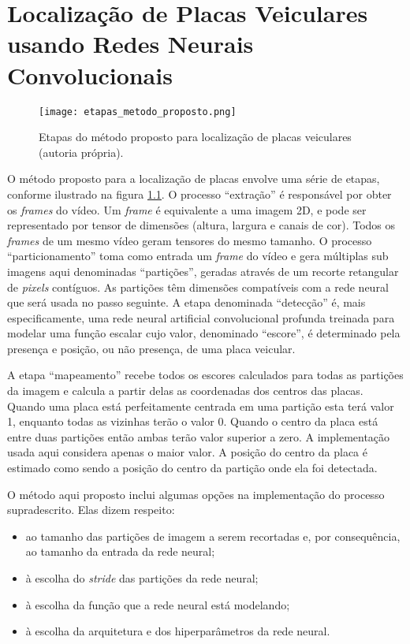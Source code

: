 \chapter{Localização de Placas Veiculares usando Redes Neurais Convolucionais}
	\label{ses:metodo}

\begin{figure}[!htb]
	\centering
	\texttt{[image: etapas\_metodo\_proposto.png]}
	\caption[Etapas do método proposto para localização de placas veiculares]{
		Etapas do método proposto para localização de placas veiculares
		(autoria própria).}
	\label{fig:etapas_metodo_proposto}
\end{figure}

O método proposto para a localização de placas envolve uma série de etapas,
conforme ilustrado na figura \ref{fig:etapas_metodo_proposto}.
O processo ``extração'' é responsável por obter os \emph{frames} do vídeo.
Um \emph{frame} é equivalente a uma imagem 2D, e pode ser representado por
tensor de dimensões  (altura, largura e canais de cor). Todos os \emph{frames} de um mesmo
vídeo geram tensores do mesmo tamanho.
O processo ``particionamento'' toma como entrada um \emph{frame} do
vídeo e gera
múltiplas sub imagens aqui denominadas ``partições'', geradas através de um
recorte retangular de \emph{pixels} contíguos. As partições têm dimensões
compatíveis com a rede neural que será usada no passo seguinte.
A etapa denominada ``detecção'' é, mais especificamente, uma rede neural
artificial convolucional profunda treinada para modelar uma função escalar cujo
valor, denominado ``escore'', é determinado pela presença e posição, ou não
presença, de uma placa veicular.

A etapa ``mapeamento'' recebe todos os escores calculados para todas as
partições da imagem e calcula a partir delas as coordenadas dos centros das
placas. Quando uma placa está perfeitamente centrada em uma partição esta terá
valor 1, enquanto todas as vizinhas terão o valor 0. Quando o centro da placa
está entre duas partições então ambas terão valor superior a zero. A
implementação usada aqui considera apenas o maior valor. A posição do centro da
placa é estimado como sendo a posição do centro da partição onde ela foi
detectada.

O método aqui proposto inclui algumas opções na implementação do processo
supradescrito. Elas dizem respeito:

\begin{itemize}
\item ao tamanho das partições de imagem a serem recortadas e, por
	consequência, ao tamanho da entrada da rede neural;
\item à escolha do \emph{stride} das partições da rede neural;
\item à escolha da função que a rede neural está modelando;
\item à escolha da arquitetura e dos hiperparâmetros da rede neural.
\end{itemize}

